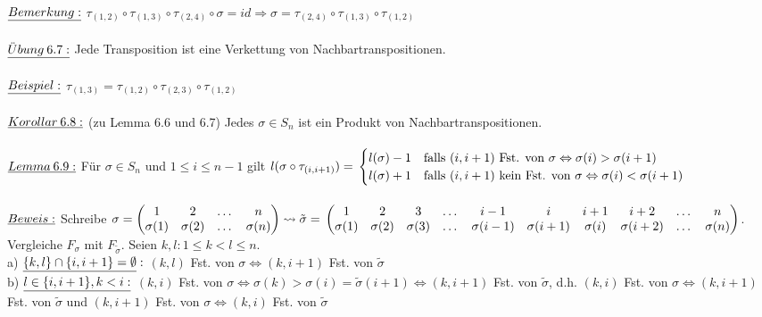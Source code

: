 \documentclass[fleqn, a4paper, 11pt]{article}
\begin{document}
\\
$\uline{Bemerkung:}$ $\tau_{(1,2)}\circ\tau_{(1,3)}\circ\tau_{(2,4)}\circ\sigma=id\Rightarrow \sigma=\tau_{(2,4)}\circ\tau_{(1,3)}\circ\tau_{(1,2)}$\\
\\
$\uline{\ddot{U}bung\:6.7:}$ Jede Transposition ist eine Verkettung von Nachbartranspositionen.\\
\\
$\uline{Beispiel:}$ $\tau_{(1,3)}=\tau_{(1,2)}\circ\tau_{(2,3)}\circ\tau_{(1,2)}$\\
\\
$\uline{Korollar\:6.8:}$ (zu Lemma 6.6 und 6.7) Jedes $\sigma\in S_n$ ist ein Produkt von Nachbartranspositionen.\\
\\
$\uline{Lemma\:6.9:}$ F\"ur $\sigma\in S_n$ und $1\leq i\leq n-1$ gilt $l(\sigma\circ\tau_{(i,i+1)})=\\
\begin{cases}
	l(\sigma )-1 & \text{falls }(i,i+1)\text{ Fst. von }\sigma\Leftrightarrow\sigma (i)>\sigma (i+1)\\
	l(\sigma )+1 & \text{falls }(i,i+1)\text{ kein Fst. von }\sigma\Leftrightarrow\sigma (i)<\sigma (i+1)
\end{cases}$\\
\\
$\uline{Beweis:}$ Schreibe $\sigma=\begin{pmatrix}
	1 & 2 & \dots & n\\
	\sigma(1) & \sigma(2) & \dots & \sigma(n)
\end{pmatrix}\leadsto \tilde{\sigma}=\\
\begin{pmatrix}
	1 & 2 & 3 & \dots & i-1 & i & i+1 & i+2 & \dots & n\\
	\sigma(1) & \sigma(2) & \sigma(3) & \dots & \sigma(i-1) & \sigma(i+1) & \sigma(i) & \sigma(i+2) & \dots & \sigma(n)
\end{pmatrix}$. Vergleiche $F_\sigma$ mit $F_{\tilde{\sigma}}$. Seien $k,l:1\leq k<l\leq n$.\\
a) $\uline{\{k,l\}\cap\{i,i+1\}=\emptyset}:$ $(k,l)$ Fst. von $\sigma\Leftrightarrow (k,i+1)$ Fst. von $\tilde{\sigma}$\\
b) $\uline{l\in\{i,i+1\},k<i:}$ $(k,i)$ Fst. von $\sigma\Leftrightarrow\sigma(k)>\sigma(i)=\tilde{\sigma}(i+1)\Leftrightarrow(k,i+1)$ Fst. von $\tilde{\sigma}$, d.h. $(k,i)$ Fst. von $\sigma\Leftrightarrow(k,i+1)$\\
 Fst. von $\tilde{\sigma}$ und $(k,i+1)$ Fst. von $\sigma\Leftrightarrow(k,i)$ Fst. von $\tilde{\sigma}$\\
\end{document}
